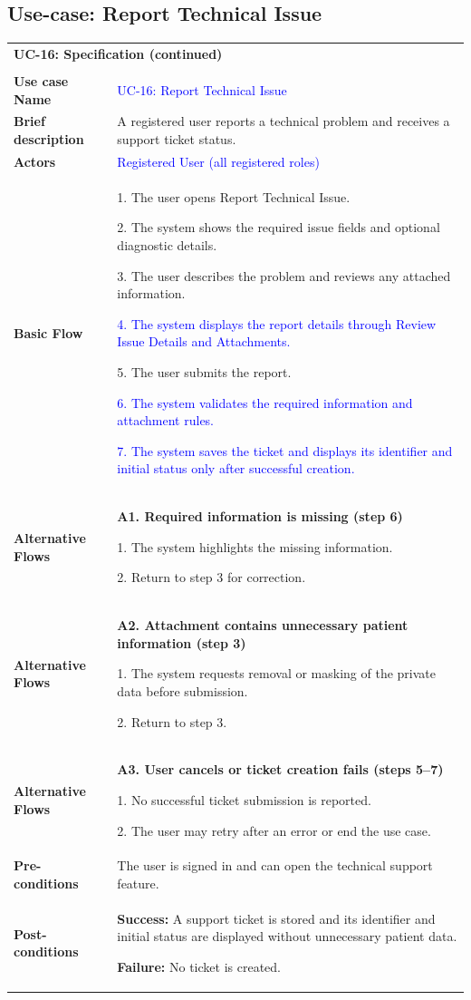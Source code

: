 \subsection{Use-case: Report Technical Issue}
\label{uc:uc-16}
\begin{longtable}{|p{}|p{}|}
\hline
\endfirsthead
\multicolumn{2}{l}{\textbf{UC-16: Specification (continued)}}\\\\
\hline
\endhead
\textbf{Use case Name} &
\textcolor{blue}{UC-16: Report Technical Issue}
\\ \hline
\textbf{Brief description} &
A registered user reports a technical problem and receives a support ticket status.
\\ \hline
\textbf{Actors} &
\textcolor{blue}{Registered User (all registered roles)}
\\ \hline
\textbf{Basic Flow} &
1. The user opens Report Technical Issue.\par
2. The system shows the required issue fields and optional diagnostic details.\par
3. The user describes the problem and reviews any attached information.\par
\textcolor{blue}{4. The system displays the report details through Review Issue Details and Attachments.}\par
5. The user submits the report.\par
\textcolor{blue}{6. The system validates the required information and attachment rules.}\par
\textcolor{blue}{7. The system saves the ticket and displays its identifier and initial status only after successful creation.}
\\ \hline
\textbf{Alternative Flows} &
\textbf{A1. Required information is missing (step 6)}\par
1. The system highlights the missing information.\par
2. Return to step 3 for correction.
\\ \hline
\textbf{Alternative Flows} &
\textbf{A2. Attachment contains unnecessary patient information (step 3)}\par
1. The system requests removal or masking of the private data before submission.\par
2. Return to step 3.
\\ \hline
\textbf{Alternative Flows} &
\textbf{A3. User cancels or ticket creation fails (steps 5--7)}\par
1. No successful ticket submission is reported.\par
2. The user may retry after an error or end the use case.
\\ \hline
\textbf{Pre-conditions} &
The user is signed in and can open the technical support feature.
\\ \hline
\textbf{Post-conditions} &
\textbf{Success:} A support ticket is stored and its identifier and initial status are displayed without unnecessary patient data.\par
\textbf{Failure:} No ticket is created.
\\ \hline
\end{longtable}
\clearpage

